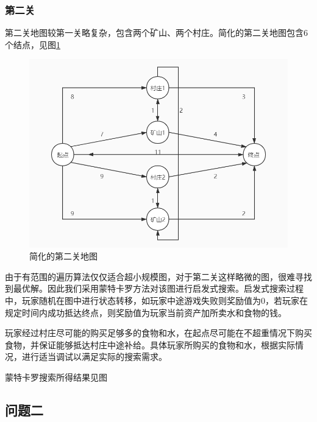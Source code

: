 \documentclass[withoutpre]{cumcmthesis} %
\begin{document}
\subsubsection{第二关}
第二关地图较第一关略复杂，包含两个矿山、两个村庄。简化的第二关地图包含6个结点，见图\cref{fig:map2}
\begin{figure}[H]
	\centering
	\includegraphics[scale=0.5]{figures/map2.jpg}
	\caption{简化的第二关地图}
	\label{fig:map2}
\end{figure}
由于有范围的遍历算法仅仅适合超小规模图，对于第二关这样略微的图，很难寻找到最优解。因此我们采用蒙特卡罗方法对该图进行启发式搜索。启发式搜索过程中，玩家随机在图中进行状态转移，如玩家中途游戏失败则奖励值为0，若玩家在规定时间内成功抵达终点，则奖励值为玩家当前资产加所卖水和食物的钱。

玩家经过村庄尽可能的购买足够多的食物和水，在起点尽可能在不超重情况下购买食物，并保证能够抵达村庄中途补给。具体玩家所购买的食物和水，根据实际情况，进行适当调试以满足实际的搜索需求。

蒙特卡罗搜索所得结果见图





\subsection{问题二}
\end{document}
